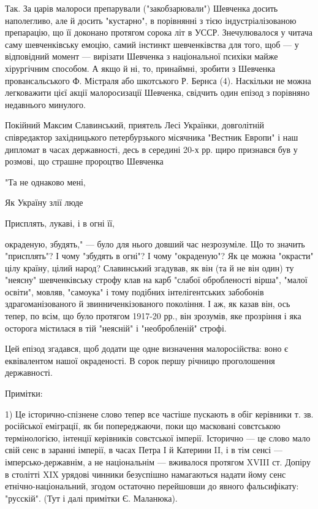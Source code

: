 Так. За царів малороси препарували ("закобзарювали") Шевченка досить наполегливо, але й досить "кустарно", в порівнянні з тією індустріалізованою препарацію, що її доконано протягом сорока літ в УССР. Знечулювалося у читача саму шевченківську емоцію, самий інстинкт шевченківства для того, щоб — у відповідний момент — вирізати Шевченка з національної психіки майже хірургічним способом. А якщо й ні, то, принаймні, зробити з Шевченка провансальського Ф. Містраля або шкотського Р. Бернса (4). Наскільки не можна легковажити цієї акції малоросизації Шевченка, свідчить один епізод з порівняно недавнього минулого.

Покійний Максим Славинський, приятель Лесі Українки, довголітній співредактор західницького петербурзького місячника "Вестник Европи" і наш дипломат в часах державності, десь в середині 20-х рр. щиро признався був у розмові, що страшне пророцтво Шевченка

"Та не однаково мені,

Як Україну злії люде

Присплять, лукаві, і в огні її,

окраденую, збудять," — було для нього довший час незрозуміле. Що то значить "присплять"? І чому "збудять в огні"? І чому "окраденую"? Як це можна "окрасти" цілу країну, цілий народ? Славинський згадував, як він (та й не він один) ту "неясну" шевченківську строфу клав на карб "слабої обробленості вірша", "малої освіти", мовляв, "самоука" і тому подібних інтелігентських забобонів здрагоманізованого й звинниченкізованого покоління. І аж, як казав він, ось тепер, по всім, що було протягом 1917-20 рр., він зрозумів, яке прозріння і яка осторога містилася в тій "неясній" і "необробленій" строфі.

Цей епізод згадався, щоб додати ще одне визначення малоросійства: воно є еквівалентом нашої окраденості. В сорок першу річницю проголошення державності.

Примітки:

1) Це історично-спізнене слово тепер все частіше пускають в обіг керівники т. зв. російської еміграції, як би попереджаючи, поки що масковані совєтською термінологією, інтенції керівників совєтської імперії. Історично — це слово мало свій сенс в заранні імперії, в часах Петра І й Катерини II, і в тім сенсі — імперсько-державнім, а не національнім — вживалося протягом XVIII ст. Допіру в столітті XIX урядові чинники безуспішно намагаються надати йому сенс етнічно-національний, згодом остаточно перейшовши до явного фальсифікату: "русскій". (Тут і далі примітки Є. Маланюка).

